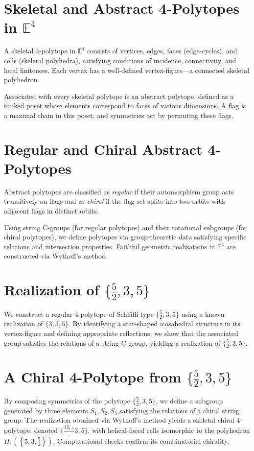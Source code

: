 \documentclass[oneside,final]{amsart}
\begin{document}
\section{Skeletal and Abstract 4-Polytopes in $\mathbb{E}^4$}
A skeletal 4-polytope in $\mathbb{E}^4$ consists of vertices, edges, faces (edge-cycles), and cells (skeletal polyhedra), satisfying conditions of incidence, connectivity, and local finiteness. Each vertex has a well-defined vertex-figure---a connected skeletal polyhedron.

Associated with every skeletal polytope is an abstract polytope, defined as a ranked poset whose elements correspond to faces of various dimensions. A flag is a maximal chain in this poset, and symmetries act by permuting these flags.

\section{Regular and Chiral Abstract 4-Polytopes}
Abstract polytopes are classified as \emph{regular} if their automorphism group acts transitively on flags and as \emph{chiral} if the flag set splits into two orbits with adjacent flags in distinct orbits.

Using string C-groups (for regular polytopes) and their rotational subgroups (for chiral polytopes), we define polytopes via group-theoretic data satisfying specific relations and intersection properties. Faithful geometric realizations in $\mathbb{E}^4$ are constructed via Wythoff's method.

\section{Realization of $\{\frac{5}{2}, 3, 5\}$}
We construct a regular 4-polytope of Schl\"afli type $\{\frac{5}{2}, 3, 5\}$ using a known realization of $\{3,3,5\}$. By identifying a star-shaped icosahedral structure in its vertex-figure and defining appropriate reflections, we show that the associated group satisfies the relations of a string C-group, yielding a realization of $\{\frac{5}{2}, 3, 5\}$.

\section{A Chiral 4-Polytope from $\{\frac{5}{2}, 3, 5\}$}
By composing symmetries of the polytope $\{\frac{5}{2}, 3, 5\}$, we define a subgroup generated by three elements $S_1, S_2, S_3$ satisfying the relations of a chiral string group. The realization obtained via Wythoff's method yields a skeletal chiral 4-polytope, denoted $\{\frac{12_{1,5}}, 3, 5\}$, with helical-faced cells isomorphic to the polyhedron $H_1\left( \left\{ 5, 3, \frac{5}{2} \right\} \right)$. Computational checks confirm its combinatorial chirality.
\end{document}
